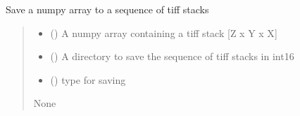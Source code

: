 \documentclass[letterpaper,10pt,english]{sphinxmanual}
\begin{document}
\begin{fulllineitems}
\label{\detokenize{IO:IO.save_tiff_stack}}
\pysigstartsignatures
{}
\pysigstopsignatures
\sphinxAtStartPar
Save a numpy array to a sequence of tiff stacks
\begin{quote}\begin{description}
\begin{itemize}
\item {} 
\sphinxAtStartPar
{} () \textendash{} A numpy array containing a tiff stack {[}Z x Y x X{]}

\item {} 
\sphinxAtStartPar
{} () \textendash{} A directory to save the sequence of tiff stacks in int16

\item {} 
\sphinxAtStartPar
{} (\sphinxstyleliteralemphasis{\sphinxupquote{{[}}}\sphinxstyleliteralemphasis{\sphinxupquote{{]}}}) \textendash{} type for saving

\end{itemize}

\sphinxAtStartPar
None

\end{description}\end{quote}

\end{fulllineitems}

\end{document}
